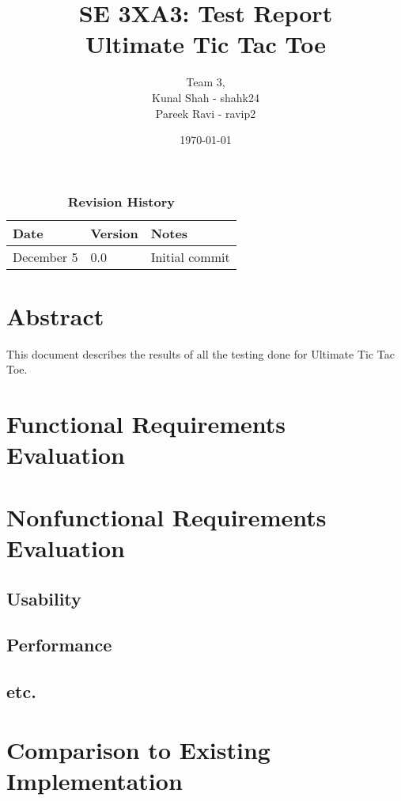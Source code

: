 \documentclass[12pt, titlepage]{article}
\title{SE 3XA3: Test Report\\Ultimate Tic Tac Toe}
\author{Team 3,
		\\ Kunal Shah - shahk24
		\\ Pareek Ravi - ravip2
}
\date{\today}
\begin{document}

\maketitle

\tableofcontents
\listoftables
\listoffigures

\newpage
\begin{table}[hp]
\caption{\bf Revision History}
\begin{tabularx}{\textwidth}{p{3cm}p{2cm}X}
\toprule {\bf Date} & {\bf Version} & {\bf Notes}\\
\midrule
December 5 & 0.0 & Initial commit\\
\bottomrule
\end{tabularx}
\end{table}

\newpage


\section*{Abstract}
This document describes the results of all the testing done for Ultimate Tic Tac Toe.

\section{Functional Requirements Evaluation}

\section{Nonfunctional Requirements Evaluation}

\subsection{Usability}
		
\subsection{Performance}

\subsection{etc.}
	
\section{Comparison to Existing Implementation}	
\end{document}
